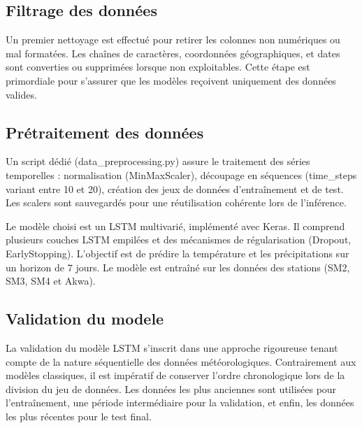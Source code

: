 \documentclass[a4paper,12pt,openany]{report}
\begin{document}
	\subsection{Filtrage des données}
	
	\quad Un premier nettoyage est effectué pour retirer les colonnes non numériques ou mal formatées. Les chaînes de caractères, coordonnées géographiques, et dates sont converties ou supprimées lorsque non exploitables. Cette étape est primordiale pour s’assurer que les modèles reçoivent uniquement des données valides.
	\subsection{Prétraitement des données}
	
	\quad Un script dédié (data\_preprocessing.py) assure le traitement des séries temporelles : normalisation (MinMaxScaler), découpage en séquences (time\_steps variant entre 10 et 20), création des jeux de données d’entraînement et de test. Les scalers sont sauvegardés pour une réutilisation cohérente lors de l’inférence.

	\quad Le modèle choisi est un LSTM multivarié, implémenté avec Keras. Il comprend plusieurs couches LSTM empilées et des mécanismes de régularisation (Dropout, EarlyStopping). L’objectif est de prédire la température et les précipitations sur un horizon de 7 jours. Le modèle est entraîné sur les données des stations (SM2, SM3, SM4 et Akwa).
	\subsection{Validation du modele}
	
	\quad La validation du modèle LSTM s’inscrit dans une approche rigoureuse tenant compte de la nature séquentielle des données météorologiques. Contrairement aux modèles classiques, il est impératif de conserver l’ordre chronologique lors de la division du jeu de données. Les données les plus anciennes sont utilisées pour l’entraînement, une période intermédiaire pour la validation, et enfin, les données les plus récentes pour le test final.
	
\end{document}
